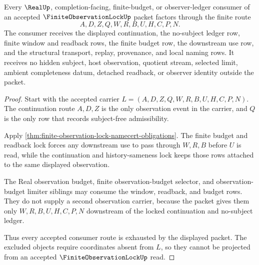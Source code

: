 \begin{theorem}
\label{thm:finite-observation-lock-consumer-route}
Every $\RealUp$, completion-facing, finite-budget, or observer-ledger consumer of an accepted $\FiniteObservationLockUp$ packet factors through the finite route
$$
A,D,Z,Q,W,R,B,U,H,C,P,N.
$$
The consumer receives the displayed continuation, the no-subject ledger row, finite window and readback rows, the finite budget row, the downstream use row, and the structural transport, replay, provenance, and local naming rows. It receives no hidden subject, host observation, quotient stream, selected limit, ambient completeness datum, detached readback, or observer identity outside the packet.
\end{theorem}
\begin{proof}
Start with the accepted carrier $L=(A,D,Z,Q,W,R,B,U,H,C,P,N)$. The continuation route $A,D,Z$ is the only observation event in the carrier, and $Q$ is the only row that records subject-free admissibility.

Apply \autoref{thm:finite-observation-lock-namecert-obligations}. The finite budget and readback lock forces any downstream use to pass through $W,R,B$ before $U$ is read, while the continuation and history-sameness lock keeps those rows attached to the same displayed observation.

The Real observation budget, finite observation-budget selector, and observation-budget limiter siblings may consume the window, readback, and budget rows. They do not supply a second observation carrier, because the packet gives them only $W,R,B,U,H,C,P,N$ downstream of the locked continuation and no-subject ledger.

Thus every accepted consumer route is exhausted by the displayed packet. The excluded objects require coordinates absent from $L$, so they cannot be projected from an accepted $\FiniteObservationLockUp$ read.
\end{proof}




